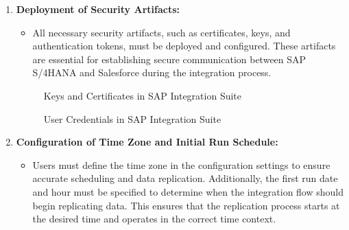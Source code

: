 \begin{enumerate}
    \item \textbf{Deployment of Security Artifacts:}
    \begin{itemize}
        \item All necessary security artifacts, such as certificates, keys, and authentication tokens, must be deployed and configured. These artifacts are essential for establishing secure communication between SAP S/4HANA and Salesforce during the integration process.
    \end{itemize}

    
    \begin{figure}[H]
    \centering
    \caption{Keys and Certificates in SAP Integration Suite}
    
    \end{figure}

    
    \begin{figure}[H]
    \centering
    \caption{User Credentials in SAP Integration Suite}
    
    \end{figure}

    \item \textbf{Configuration of Time Zone and Initial Run Schedule:}
    \begin{itemize}
        \item Users must define the time zone in the configuration settings to ensure accurate scheduling and data replication. Additionally, the first run date and hour must be specified to determine when the integration flow should begin replicating data. This ensures that the replication process starts at the desired time and operates in the correct time context.
    \end{itemize}
\end{enumerate}

